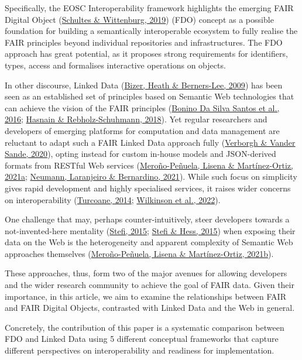 Specifically, the EOSC Interoperability framework highlights the emerging FAIR Digital Object (\protect\hyperlink{ref-IHLT6hye}{Schultes \& Wittenburg, 2019}) (FDO) concept as a possible foundation for building a semantically interoperable ecosystem to fully realise the FAIR principles beyond individual repositories and infrastructures. The FDO approach has great potential, as it proposes strong requirements for identifiers, types, access and formalises interactive operations on objects.

In other discourse, Linked Data (\protect\hyperlink{ref-19s3yyxDn}{Bizer, Heath \& Berners-Lee, 2009}) has been seen as an established set of principles based on Semantic Web technologies that can achieve the vision of the FAIR principles (\protect\hyperlink{ref-EJDjHrUv}{Bonino Da Silva Santos et al., 2016}; \protect\hyperlink{ref-GJHYN6xW}{Hasnain \& Rebholz-Schuhmann, 2018}). Yet regular researchers and developers of emerging platforms for computation and data management are reluctant to adapt such a FAIR Linked Data approach fully (\protect\hyperlink{ref-jHwttlTs}{Verborgh \& Vander Sande, 2020}), opting instead for custom in-house models and JSON-derived formats from RESTful Web services (\protect\hyperlink{ref-99MS5xE0}{Meroño-Peñuela, Lisena \& Martínez-Ortiz, 2021a}; \protect\hyperlink{ref-J2H8yssV}{Neumann, Laranjeiro \& Bernardino, 2021}). While such focus on simplicity gives rapid development and highly specialised services, it raises wider concerns on interoperability (\protect\hyperlink{ref-DNTCUjpC}{Turcoane, 2014}; \protect\hyperlink{ref-Pa67pUtR}{Wilkinson et al., 2022}).

One challenge that may, perhaps counter-intuitively, steer developers towards a not-invented-here mentality (\protect\hyperlink{ref-uxWjmlio}{Stefi, 2015}; \protect\hyperlink{ref-v0WwFHgT}{Stefi \& Hess, 2015}) when exposing their data on the Web is the heterogeneity and apparent complexity of Semantic Web approaches themselves (\protect\hyperlink{ref-5V3GqSzR}{Meroño-Peñuela, Lisena \& Martínez-Ortiz, 2021b}).

These approaches, thus, form two of the major avenues for allowing developers and the wider research community to achieve the goal of FAIR data. Given their importance, in this article, we aim to examine the relationships between FAIR and FAIR Digital Objects, contrasted with Linked Data and the Web in general.

Concretely, the contribution of this paper is a systematic comparison between FDO and Linked Data using 5 different conceptual frameworks that capture different perspectives on interoperability and readiness for implementation.

